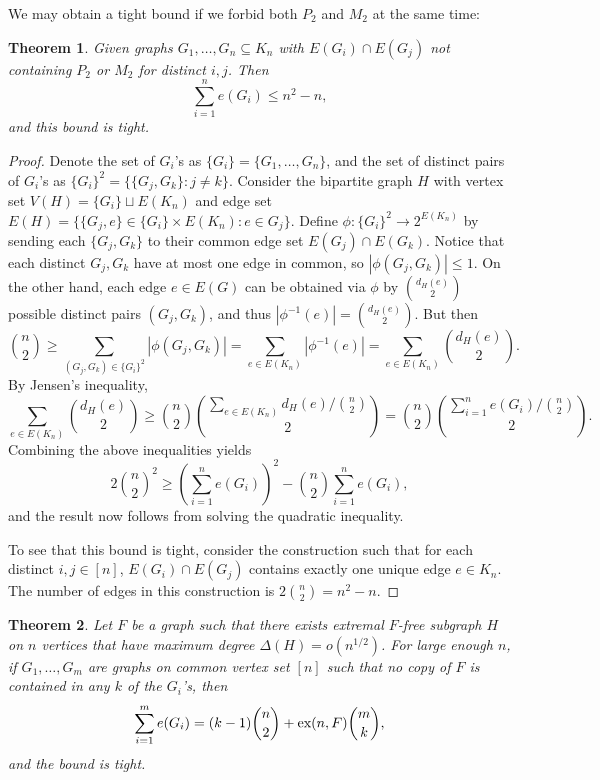 \documentclass[12pt]{report}
\newtheorem{theorem}{Theorem}[chapter]
\begin{document}
We may obtain a tight bound if we forbid both $P_2$ and $M_2$ at the same time:

\begin{theorem}
  Given graphs $G_1, \ldots, G_n \subseteq K_n$ with $E(G_i) \cap E(G_j)$ not containing $P_2$ or
  $M_2$ for distinct $i, j$. Then
  \[
    \sum_{i = 1}^n e(G_i) \leq n^2 - n,
  \]
  and this bound is tight.
\end{theorem}

\begin{proof}
  Denote the set of $G_i$'s as $\{G_i\} = \{G_1, \ldots, G_n\}$, and the set of distinct pairs of
  $G_i$'s as $\{G_i\}^2 = \{\{G_j, G_k\} : j \neq k\}$. Consider the bipartite graph $H$ with
  vertex set $V(H) = \{G_i\} \sqcup E(K_n)$ and edge set $E(H) = \{\{G_j, e\} \in \{G_i\} \times
  E(K_n) : e \in G_j\}$. Define $\phi: \{G_i\}^2 \to 2^{E(K_n)}$ by sending each $\{G_j, G_k\}$ to
  their common edge set $E(G_j) \cap E(G_k)$. Notice that each distinct $G_j, G_k$ have at most
  one edge in common, so $|\phi(G_j, G_k)| \leq 1$. On the other hand, each edge $e \in E(G)$ can
  be obtained via $\phi$ by $\binom{d_H(e)}{2}$ possible distinct pairs $(G_j, G_k)$, and thus
  $|\phi^{-1}(e)| = \binom{d_H(e)}{2}$. But then
  \[
    \binom{n}{2} \geq \sum_{(G_j, G_k) \in \{G_i\}^2} |\phi(G_j, G_k)| = \sum_{e \in E(K_n)} |\phi^{-1}(e)| = \sum_{e \in E(K_n)} \binom{d_H(e)}{2}.
  \]
  By Jensen's inequality,
  \[
    \sum_{e \in E(K_n)} \binom{d_H(e)}{2} \geq \binom{n}{2}\binom{\sum_{e \in E(K_n)} d_H(e)/\binom{n}{2}}{2} = \binom{n}{2}\binom{\sum_{i = 1}^n e(G_i)/\binom{n}{2}}{2}.
  \]
  Combining the above inequalities yields
  \[
    2\binom{n}{2}^2 \geq \left(\sum_{i = 1}^n e(G_i)\right)^2 - \binom{n}{2}\sum_{i = 1}^n e(G_i),
  \]
  and the result now follows from solving the quadratic inequality.

  To see that this bound is tight, consider the construction such that for each distinct $i, j \in
  [n]$, $E(G_i) \cap E(G_j)$ contains exactly one unique edge $e \in K_n$. The number of edges in
  this construction is $2\binom{n}{2} = n^2 - n$.
\end{proof}

 

\begin{theorem}
  Let $F$ be a graph such that there exists extremal $F$-free subgraph $H$ on $n$ vertices that have
  maximum degree $\Delta(H) = o(n^{1/2})$. For large enough $n$, if $G_1, \ldots, G_m$ are graphs on
  common vertex set $[n]$ such that no copy of $F$ is contained in any $k$ of the $G_i$'s, then
  \[
    \sum_{i = 1}^m e(G_i) = (k - 1)\binom{n}{2} + \textnormal{ex}(n, F)\binom{m}{k},
  \]
  and the bound is tight.
\end{theorem}
\end{document}

